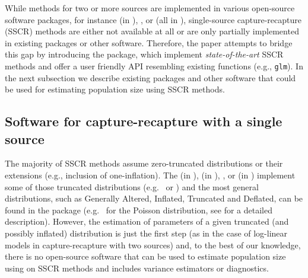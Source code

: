 \documentclass[
]{jss}
\newcommand{\1}{\mathcal{I}} \newcommand{\bZero}{\boldsymbol{0}}
\begin{document}
While methods for two or more sources are implemented in various
open-source software packages, for instance 
\citep{yang2006care4} (in ), 
\citep{baillargeon2007rcapture},  \citep{laake2013marked} or
 \citep{yee2015vgam} (all in ), single-source
capture-recapture (SSCR) methods are either not available at all or are
only partially implemented in existing  packages or other
software. Therefore, the paper attempts to bridge this gap by
introducing the  package, which implement
\emph{state-of-the-art} SSCR methods and offer a user friendly API
resembling existing  functions (e.g., \texttt{glm}). In the
next subsection we describe existing  packages and other
software that could be used for estimating population size using SSCR
methods.

\subsection{Software for capture-recapture with a single
source}\label{sec-software}

The majority of SSCR methods assume zero-truncated distributions or
their extensions (e.g., inclusion of one-inflation). The
 \citep{Distributionsjl} (in ),
 \citep{seabold2010statsmodels} (in ),
 \citep{countreg},  \citep{VGAM-main} or
 \citep{distributions3} (in ) implement
some of those truncated distributions
(e.g.~ or )
and the most general distributions, such as Generally Altered, Inflated,
Truncated and Deflated, can be found in the  package
(e.g.~ for the Poisson distribution, see
\citet{gaitdcount} for a detailed description). However, the estimation
of parameters of a given truncated (and possibly inflated) distribution
is just the first step (as in the case of log-linear models in
capture-recapture with two sources) and, to the best of our knowledge,
there is no open-source software that can be used to estimate population
size using on SSCR methods and includes variance estimators or
diagnostics.
\end{document}
